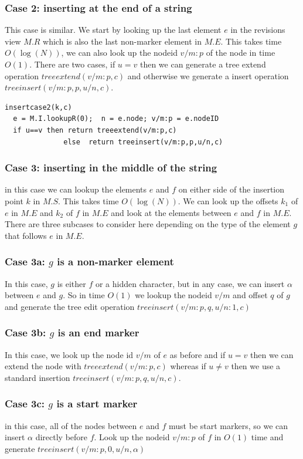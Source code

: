 \documentclass{amsart}
\begin{document}
\subsubsection{Case 2: inserting at the end of a string}
This case is similar. We start by looking up the last element $e$ in the revisions view $M.R$ which is also the last non-marker element in $M.E$. This takes time $O(\log(N))$, we can also look up the nodeid $v/m:p$ of the node in time $O(1)$.  There are
two cases, if $u=v$ then we can generate a tree extend operation
$treeextend(v/m:p,c)$ and otherwise we generate a insert operation
$treeinsert(v/m:p,p,u/n,c)$.
\begin{verbatim}
insertcase2(k,c)
  e = M.I.lookupR(0);  n = e.node; v/m:p = e.nodeID
  if u==v then return treeextend(v/m:p,c)
              else  return treeinsert(v/m:p,p,u/n,c)
\end{verbatim}

\subsubsection{Case 3: inserting in the middle of the string}
in this case we can lookup the elements $e$ and $f$ on either side of the insertion point $k$ in $M.S$. This takes time $O(\log(N))$.  We can look up the offsets $k_1$ of $e$ in $M.E$ and $k_2$ of $f$ in $M.E$ and look at the elements between $e$ and $f$ in $M.E$. There are three subcases to consider here depending on the type of the element $g$ that follows $e$ in $M.E$.

\subsubsection{Case 3a: $g$ is a non-marker element}
In this case, $g$ is either $f$ or a hidden character, but in any case, we can insert $\alpha$ between $e$ and $g$. So in time $O(1)$ we lookup the nodeid $v/m$ and
offset $q$ of $g$ and generate the tree edit operation 
$treeinsert(v/m:p,q,u/n:1,c)$

\subsubsection{Case 3b: $g$ is an end marker}
In this case, we look up the node id $v/m$ of $e$ as before and if $u=v$
then we can extend the node with $treeextend(v/m:p,c)$ whereas if $u\ne v$
then we use a standard insertion $treeinsert(v/m:p,q,u/n,c)$.

\subsubsection{Case 3c: $g$ is a start marker}
in this case, all of the nodes between $e$ and $f$ must be start markers,
so we can insert $\alpha$ directly before $f$.  Look up the nodeid $v/m:p$ of $f$
in $O(1)$ time and generate $treeinsert(v/m:p,0,u/n,\alpha)$
\end{document}
